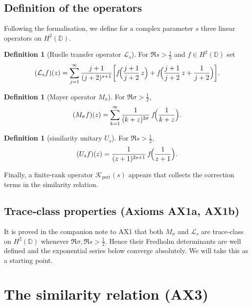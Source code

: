 \documentclass[11pt,a4paper]{article}
\theoremstyle{definition}
\newtheorem{definition}[theorem]{Definition}
\theoremstyle{remark}
\newcommand{\D}{\mathbb{D}}
\newcommand{\LOp}{\mathcal{L}}
\newcommand{\MOp}{M}
\newcommand{\UOp}{U}
\newcommand{\KO}{\mathcal{K}}
\begin{document}
\subsection{Definition of the operators}\label{subsec:defs}

Following the formalisation, we define for a complex parameter \(s\) three linear operators on \(H^2(\D)\).

\begin{definition}[Ruelle transfer operator \(\LOp_s\)]
For \(\Re s> \frac12\) and \(f\in H^2(\D)\) set
\begin{equation}\label{eq:Ldef}
(\LOp_s f)(z) = \sum_{j=1}^{\infty} \frac{j+1}{(j+2)^{s+1}}
\biggl[ f\!\Bigl( \frac{j+1}{j+2}\,z \Bigr)
      + f\!\Bigl( \frac{j+1}{j+2}\,z + \frac{1}{j+2} \Bigr) \biggr].
\end{equation}
\end{definition}

\begin{definition}[Mayer operator \(\MOp_\sigma\)]
For \(\Re \sigma > \frac12\),
\begin{equation}\label{eq:Mdef}
(\MOp_\sigma f)(z) = \sum_{k=1}^{\infty} \frac{1}{(k+z)^{2\sigma}}\,
f\!\Bigl( \frac{1}{k+z} \Bigr).
\end{equation}
\end{definition}

\begin{definition}[similarity unitary \(\UOp_s\)]
For \(\Re s > \frac12\),
\begin{equation}\label{eq:Udef}
(\UOp_s f)(z) = \frac{1}{(z+1)^{2s+1}}\, f\!\Bigl( \frac{1}{z+1} \Bigr).
\end{equation}
\end{definition}

Finally, a finite‑rank operator \(\KO_{\mathrm{pert}}(s)\) appears that collects the correction terms in the similarity relation.

\subsection{Trace‑class properties (Axioms AX1a, AX1b)}

It is proved in the companion note to AX1 that both \(\MOp_\sigma\) and \(\LOp_s\) are trace‑class on \(H^2(\D)\) whenever \(\Re\sigma,\Re s > \frac12\).
Hence their Fredholm determinants are well defined and the exponential series below converge absolutely.
We will take this as a starting point.

\section{The similarity relation (AX3)}\label{sec:sim}
\end{document}
